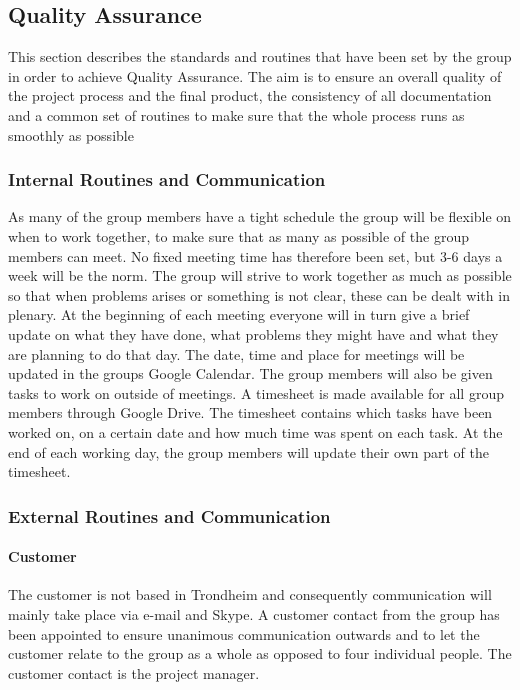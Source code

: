 \subsection{Quality Assurance}

This section describes the standards and routines that have been set by the group in order to achieve Quality Assurance. The aim is to ensure an overall quality of the project process and the final product, the consistency of all documentation and a common set of routines to make sure that the whole process runs as smoothly as possible

\subsubsection{Internal Routines and Communication}

As many of the group members have a tight schedule the group will be flexible on when to work together, to make sure that as many as possible of the group members can meet. No fixed meeting time has therefore been set, but 3-6 days a week will be the norm. The group will strive to work together as much as possible so that when problems arises or something is not clear, these can be dealt with in plenary. At the beginning of each meeting everyone will in turn give a brief update on what they have done, what problems they might have and what they are planning to do that day. The date, time and place for meetings will be updated in the groups Google Calendar. The group members will also be given tasks to work on outside of meetings. A timesheet is made available for all group members through Google Drive. The timesheet contains which tasks have been worked on, on a certain date and how much time was spent on each task. At the end of each working day, the group members will update their own part of the timesheet.

\subsubsection{External Routines and Communication}

\paragraph{Customer}

The customer is not based in Trondheim and consequently communication will mainly take place via e-mail and Skype. A customer contact from the group has been appointed to ensure unanimous communication outwards and to let the customer relate to the group as a whole as opposed to four individual people. The customer contact is the project manager. 

